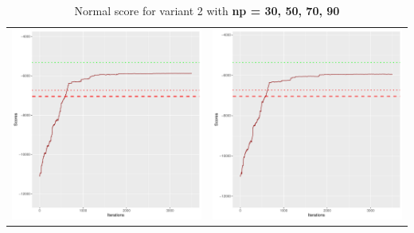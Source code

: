 \documentclass[]{scrartcl}
\begin{document}
\begin{table}[h!]
\begin{tabular}{cc}
\includegraphics[scale = 0.4]{./figs/alarm/v2/70/boundsEvolution-3502.pdf} & 
\includegraphics[scale = 0.4]{./figs/alarm/v2/90/boundsEvolution-3502.pdf} \\
\end{tabular}
\caption{Normal score for variant 2 with \textbf{np =  30, 50, 70, 90 }}
\end{table}
\end{document}
